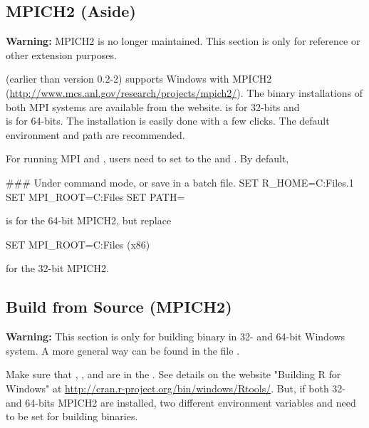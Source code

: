 

\subsection[MPICH2 (Aside)]{MPICH2 (Aside)}
\label{sec:mpich2}

{\color{red} \bf Warning:}
MPICH2 is no longer maintained.
This section is only for reference or other extension purposes.


 (earlier than version 0.2-2) supports Windows with
MPICH2 (\url{http://www.mcs.anl.gov/research/projects/mpich2/}).
The binary installations of both MPI systems are available
from the website.
 is for 32-bits and \\
 is for 64-bits.
The installation is easily done with a few clicks. The
default environment and path are recommended.

For running MPI and , users need to set  to the
 and . By default,
\begin{Command}
### Under command mode, or save in a batch file.
SET R_HOME=C:\Program Files\R{}.1
SET MPI_ROOT=C:\Program Files
SET PATH=%
\end{Command}
is for the 64-bit MPICH2, but replace
\begin{Command}
SET MPI_ROOT=C:\Program Files (x86)
\end{Command}
for the 32-bit MPICH2.


\subsection[Build from Source (MPICH2)]{Build from Source (MPICH2)}
\label{sec:building_from_source_mpich2}

{\color{red} \bf Warning:} This section is only for building binary in
32- and 64-bit Windows system. A more general way can be found in the file
.

Make sure that , , and  are in the .
See details on the website "Building R for Windows" at
\url{http://cran.r-project.org/bin/windows/Rtools/}.
But, if both 32- and 64-bits MPICH2 are installed, two different
environment variables  and 
need to be set for building binaries.

